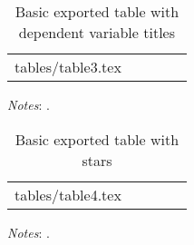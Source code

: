 \documentclass[a4paper]{article}
\makeatletter
\newcommand\primitiveinput[1]
{\@@input #1 }
\makeatother
\begin{document}
\begin{table}[H]
	\centering
	\label{tab:Table3}
	\begin{adjustbox}{max width=\linewidth}
		\begin{threeparttable}
			\caption{Basic exported table with dependent variable titles}
			\begin{tabular}{@{}l*{4}{c}@{}}
                \toprule
                \toprule 
				\primitiveinput{tables/table3.tex}
				\bottomrule
			\end{tabular}
			\begin{tablenotes}
				\setlength{}
				\footnotesize
				\item \textit{Notes}: \lipsum[1].
			\end{tablenotes}
		\end{threeparttable}
	\end{adjustbox}
\end{table}
\newpage 

\begin{table}[H]
	\centering
	\label{tab:Table4}
	\begin{adjustbox}{max width=\linewidth}
		\begin{threeparttable}
			\caption{Basic exported table with stars}
			\begin{tabular}{@{}l*{4}{c}@{}}
                \toprule
                \toprule 
				\primitiveinput{tables/table4.tex}
				\bottomrule
			\end{tabular}
			\begin{tablenotes}
				\setlength\labelsep{0pt}
				\footnotesize
				\item \textit{Notes}: \lipsum[1].
			\end{tablenotes}
		\end{threeparttable}
	\end{adjustbox}
\end{table}

\newpage 
\end{document}
